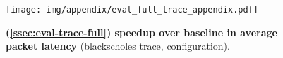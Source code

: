 \begin{figure}[h]
\centering
\captionsetup{justification=centering}
\texttt{[image: img/appendix/eval\_full\_trace\_appendix.pdf]}
\caption{\textbf{(\textsection \ref{ssec:eval-trace-full}) speedup over baseline in average packet latency} (blackscholes trace, \textit{\name} configuration).}
\label{fig:app-eval-trace-full}
\end{figure}
